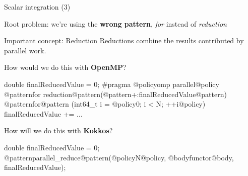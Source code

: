 \begin{frame}[fragile]{Scalar integration (3)}

  {\color{red}Root problem}: we're using the \textbf{wrong pattern}, \emph{for} instead of \emph{reduction}

  \pause
  \vspace{5pt}

  \begin{block}{Important concept: Reduction}
    Reductions combine the results contributed by parallel work.
  \end{block}

  \vspace{10pt}
  \pause

  How would we do this with \textbf{OpenMP}?

  \vspace{-3pt}

  \begin{code}[linebackgroundcolor={
        \btLstHL<3->{4}{bodyColor}
      }
    ]
double finalReducedValue = 0;
#pragma @policyomp parallel@policy @patternfor reduction@pattern(@pattern+:finalReducedValue@pattern)
@patternfor@pattern (int64_t i = @policy0; i < N; ++i@policy) {
  finalReducedValue += ...
}
  \end{code}

  \pause
  How will we do this with \textbf{Kokkos}?

  \vspace{-3pt}

  \begin{code}[linebackgroundcolor={
        \btLstHL<4->{4}{bodyColor}
      }
    ]
double finalReducedValue = 0;
@patternparallel_reduce@pattern(@policyN@policy, @bodyfunctor@body, finalReducedValue);
  \end{code}

  \vspace{-5pt}

\end{frame}



